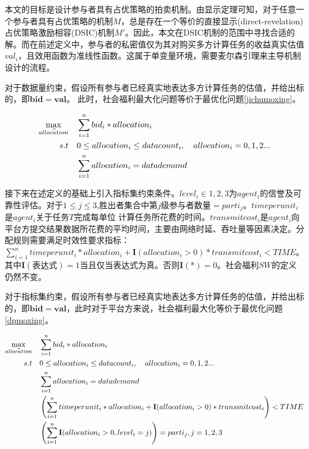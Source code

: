 \documentclass[promaster]{thesis-uestc}
\begin{document}
本文的目标是设计参与者具有占优策略的拍卖机制。由显示定理可知，对于任意一个参与者具有占优策略的机制$M$，总是存在一个等价的直接显示(direct-revelation)占优策略激励相容(DSIC)机制$M'$。因此，本文在DSIC机制的范围中寻找合适的解。而在前述定义中，参与者的私密值仅为其对购买多方计算任务的收益真实估值$val_i$，且效用函数为准线性函数。这属于单变量环境，需要麦尔森引理来主导机制设计的流程。

对于数据量约束，假设所有参与者已经真实地表达多方计算任务的估值，并给出标的，即$\mathbf{bid} = \mathbf{val}$。 此时，社会福利最大化问题等价于最优化问题\ref{jichumoxing}。

\begin{align}
    \label{jichumoxing}\max_{\vec{allocation}} \quad&\sum_{i=1}^{n}{bid_i*allocation_i}\\
    s.t                     \quad& 0\leq allocation_i\leq datacount_i,\quad allocation_i = {0,1,2...}\notag\\
                            \quad& \sum_{i=1}^{n}{allocation_i} = datademand\notag 
\end{align}

接下来在述定义的基础上引入指标集约束条件。$level_i\in {1,2,3}$为$agent_i$的信誉及可靠性评估。对于$1\leq j \leq 3$,胜出者集合中第$j$级参与者数量$=parti_j$。$timeperunit_i$是$agent_i$关于$任务T$完成每单位
计算任务所花费的时间。$transmitcost_i$是$agent_i$向平台方提交结果数据所花费的平均时间，主要由网络时延、吞吐量等因素决定。分配规则需要满足时效性要求指标：$\sum_{i=1}^{n}{timeperunit_i*allocation_i+\mathbf{I}(allocation_i > 0)*transmitcost_i} < TIME$。
其中$\mathbf{I}(\text{表达式}) = 1$当且仅当表达式为真。否则$\mathbf{I}(\text{*}) = 0$。社会福利$SW$的定义仍然不变。



对于指标集约束，假设所有参与者已经真实地表达多方计算任务的估值，并给出标的，即$\mathbf{bid} = \mathbf{val}$，此时对于平台方来说，社会福利最大化等价于最优化问题\ref{dpmoxing}。

\begin{align}
    \label{dpmoxing}\max_{\vec{allocation}} \quad&\sum_{i=1}^{n}{bid_i*allocation_i}\\
    s.t\quad& 0\leq allocation_i\leq datacount_i,\quad allocation_i = {0,1,2...}\notag\\
        \quad& \sum_{i=1}^{n}{allocation_i} = datademand\notag\\
        \quad& \left(\sum_{i=1}^{n}{timeperunit_i*allocation_i+\mathbf{I}(allocation_i > 0)*transmitcost_i}\right) < TIME\notag\\
        \quad& \left(\sum_{i=1}^{n}{\mathbf{I}(allocation_i > 0,level_i = j)}\right)=parti_j, j = {1,2,3}\notag
\end{align}
\end{document}
